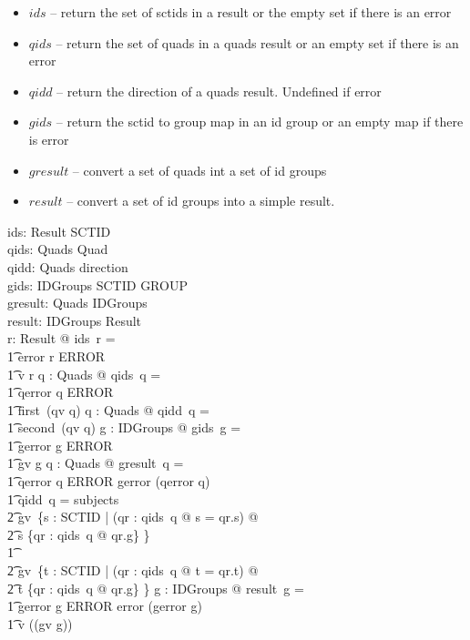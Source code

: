 \documentclass{article}
\begin{document}
\begin{itemize}[noitemsep,nolistsep]
\item{$ids$} -- return the set of sctids in a result or the empty set if there is an error
\item{$qids$} -- return the set of quads in a quads result or an empty set if there is an error
\item{$qidd$} -- return the direction of a quads result.  Undefined if error
\item{$gids$} -- return the sctid to group map in an id group or an empty map if there is error
\item{$gresult$} -- convert a set of quads int a set of id groups
\item{$result$} -- convert a set of id groups into a simple result.
\end{itemize}
\begin{gendef}
   ids: Result \fun \power SCTID \\
   qids: Quads \fun \power Quad  \\
   qidd: Quads \pfun direction \\
   gids: IDGroups \fun SCTID \fun \power GROUP \\
   gresult: Quads \fun IDGroups \\
   result: IDGroups \fun Result \\
\where
   \forall r: Result @ ids~r = \\
\t1 \IF error \inv r \in ERROR \THEN \emptyset \\
\t1 \ELSE v \inv r
\also
   \forall q : Quads @ qids~q = \\
\t1 \IF qerror \inv q \in ERROR \THEN \emptyset \\
\t1 \ELSE first~(qv \inv q)
\also
   \forall q : Quads @ qidd~q = \\
\t1 second~(qv \inv q)
\also
   \forall g : IDGroups @ gids~g = \\
\t1 \IF gerror \inv g \in ERROR \THEN \emptyset \\
\t1 \ELSE gv \inv g
\also
   \forall q : Quads @ gresult~q = \\
\t1 \IF qerror  \inv q \in ERROR \THEN gerror (qerror \inv q) \\
\t1 \ELSE \IF qidd~q = subjects \\
\t2 \THEN gv~\{s : SCTID | (\exists qr : qids~q @ s = qr.s) @ \\
\t2 s \mapsto \{qr : qids~q @ qr.g\} \} \\
\t1 \ELSE \\
\t2 gv~\{t : SCTID | (\exists qr : qids~q @ t = qr.t) @ \\
\t2 t \mapsto \{qr : qids~q @ qr.g\} \} 
\also
   \forall g : IDGroups @ result~g = \\
\t1 \IF gerror \inv g \in ERROR \THEN error (gerror \inv g) \\
\t1 \ELSE v (\dom (gv \inv g))
\end{gendef}
\end{document}
